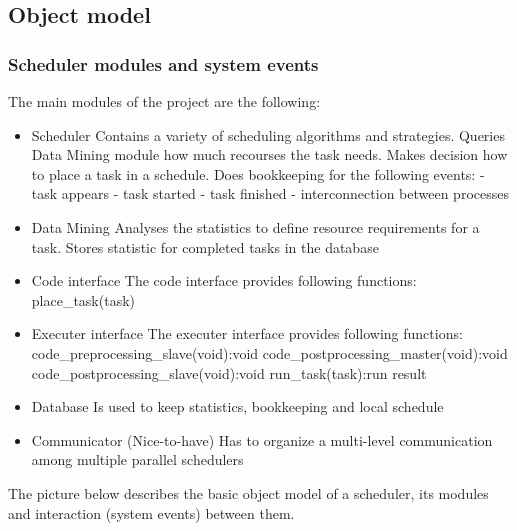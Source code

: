 \newpage


\newpage
\subsection{Object model}

\vspace{0.5cm}
\subsubsection{Scheduler modules and system events}
\vspace{0.5cm}
The main modules of the project are the following:
\begin{itemize}
	\item Scheduler
		\subitem Contains a variety of scheduling algorithms and strategies.
		\subitem Queries Data Mining module how much recourses the task needs.
		\subitem Makes decision how to place a task in a schedule.
		\subitem Does bookkeeping for the following events:
			\subsubitem - task appears
			\subsubitem - task started
			\subsubitem - task finished
			\subsubitem - interconnection between processes
	\item Data Mining
		\subitem Analyses the statistics to define resource requirements for a task.
		\subitem Stores statistic for completed tasks in the database
	
	\item Code interface
		\subitem The code interface provides following functions:
			\subsubitem place\_task(task)
			
	\item Executer interface
		\subitem The executer interface provides following functions:
			\subsubitem code\_preprocessing\_slave(void):void
			\subsubitem code\_postprocessing\_master(void):void
			\subsubitem code\_postprocessing\_slave(void):void
			\subsubitem run\_task(task):run result
	
	\item Database
		\subitem Is used to keep statistics, bookkeeping and local schedule
		
	\item Communicator (Nice-to-have)
		\subitem Has to organize a multi-level communication among multiple parallel schedulers
\end{itemize}
\vspace{1cm}
The picture below describes the basic object model of a scheduler, its modules and interaction (system events) between them.

